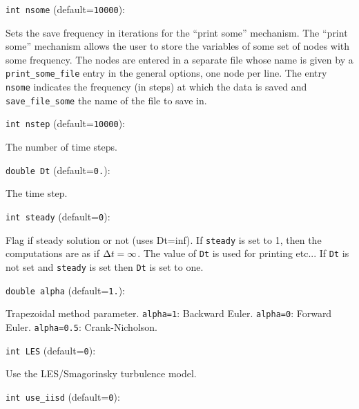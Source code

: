 \item\verb+int nsome+ {\rm(default=\verb|10000|)}:

Sets the save frequency in iterations for the ``print some''
mechanism. 
\label{sec:print_some}
The ``print some'' mechanism allows the user to store the variables of
some set of nodes with some frequency. The nodes are entered in a
separate file whose name is given by a \verb+print_some_file+ entry in
the general options, one node per line. The entry \verb+nsome+
indicates the frequency (in steps) at which the data is saved and
\verb+save_file_some+ the name of the file to save in. 

\item\verb+int nstep+ {\rm(default=\verb|10000|)}:

The number of time steps. 

\item\verb+double Dt+ {\rm(default=\verb|0.|)}:

The time step.

\item\verb+int steady+ {\rm(default=\verb|0|)}:

Flag if steady solution or not (uses Dt=inf). If \verb+steady+
is set to 1, then the computations are as if ${\Delta t}=\infty$. 
The value of \verb+Dt+ is used for printing etc... If \verb+Dt+
is not set and \verb+steady+ is set then \verb+Dt+ is set to one.

\item\verb+double alpha+ {\rm(default=\verb|1.|)}:

Trapezoidal method parameter. \verb+alpha=1+:
Backward Euler. \verb+alpha=0+: Forward Euler.
\verb+alpha=0.5+: Crank-Nicholson. 

\item\verb+int LES+ {\rm(default=\verb|0|)}:

Use the LES/Smagorinsky turbulence model. 

\item\verb+int use_iisd+ {\rm(default=\verb|0|)}:

